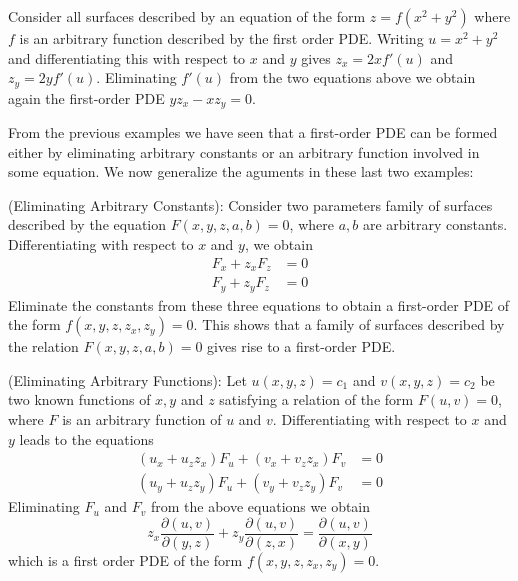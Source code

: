 \begin{example}
    Consider all surfaces described by an equation of the form $z = f(x^2+y^2)$ where $f$ is an arbitrary function described by the first order PDE. Writing $u = x^2+y^2$ and differentiating this with respect to $x$ and $y$ gives $z_x = 2xf'(u)$ and $z_y = 2yf'(u)$. Eliminating $f'(u)$ from the two equations above we obtain again the first-order PDE $yz_x - xz_y = 0$.
\end{example}

From the previous examples we have seen that a first-order PDE can be formed either by eliminating arbitrary constants or an arbitrary function involved in some equation. We now generalize the aguments in these last two examples:

\begin{remark}[Method I]{(Eliminating Arbitrary Constants):}
    Consider two parameters family of surfaces described by the equation $F(x,y,z,a,b) = 0$, where $a,b$ are arbitrary constants. Differentiating with respect to $x$ and $y$, we obtain \begin{align*}
        F_x + z_xF_z &= 0 \\ 
        F_y + z_yF_z &= 0
    \end{align*}
    Eliminate the constants from these three equations to obtain a first-order PDE of the form $f(x,y,z,z_x,z_y) = 0$. This shows that a family of surfaces described by the relation $F(x,y,z,a,b) = 0$ gives rise to a first-order PDE.
\end{remark}

\begin{remark}[Method II]{(Eliminating Arbitrary Functions):}
    Let $u(x,y,z) = c_1$ and $v(x,y,z) = c_2$ be two known functions of $x, y$ and $z$ satisfying a relation of the form $F(u,v) = 0$, where $F$ is an arbitrary function of $u$ and $v$. Differentiating with respect to $x$ and $y$ leads to the equations \begin{align*}
        (u_x+u_zz_x)F_u+(v_x+v_zz_x)F_v &= 0 \\
        (u_y+u_zz_y)F_u+(v_y+v_zz_y)F_v &= 0 
    \end{align*}
    Eliminating $F_u$ and $F_v$ from the above equations we obtain \begin{equation*}
        z_x\frac{\partial(u,v)}{\partial(y,z)}+z_y\frac{\partial(u,v)}{\partial(z,x)} = \frac{\partial(u,v)}{\partial(x,y)}
    \end{equation*}
    which is a first order PDE of the form $f(x,y,z,z_x,z_y) = 0$.
\end{remark}

